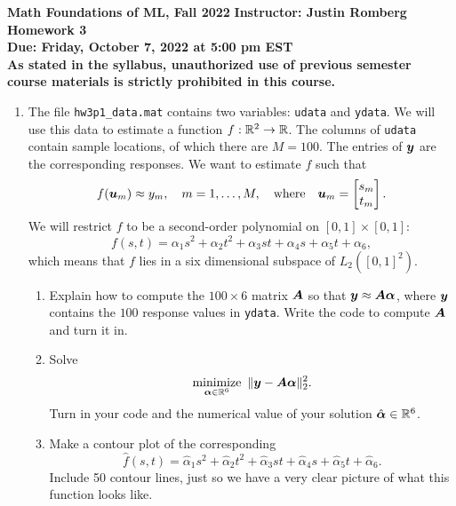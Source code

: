 \documentclass[11pt]{article}
\begin{document}

\noindent
{\bf\large Math Foundations of ML, Fall 2022} \hspace{2cm} {\bf\large Instructor: Justin Romberg} \\[3mm]
{\bf Homework 3} \\[3mm]
{\bf Due: Friday, October 7, 2022 at 5:00 pm EST}\\[3mm]

{\bf As stated in the syllabus, unauthorized use of previous semester course materials is strictly prohibited in this course.}

\begin{enumerate}













\vspace{4mm} 
\item The file \texttt{hw3p1\_data.mat} contains two variables: \texttt{udata} and \texttt{ydata}.  We will use this data to estimate a function $f:\mathbb{R}^2\rightarrow\mathbb{R}$.  The columns of \texttt{udata} contain sample locations, of which there are $M=100$.  The entries of $\boldsymbol{y}$ are the corresponding responses.  We want to estimate $f$ such that
\[
	f(\boldsymbol{u}_m)\approx y_m,\quad m = 1,\ldots,M, \quad\text{where}\quad \boldsymbol{u}_m = \begin{bmatrix} s_m \\ t_m \end{bmatrix}.
\]
We will restrict $f$ to be a second-order polynomial on $[0,1]\times[0,1]$:
\begin{equation}
	\label{eq:secondorderpoly}
	f(s,t) = \alpha_1s^2 + \alpha_2t^2 + \alpha_3st + \alpha_4s + \alpha_5t + \alpha_6,
\end{equation}
which means that $f$ lies in a six dimensional subspace of $L_2([0,1]^2)$.
\begin{enumerate}
	\item Explain how to compute the $100\times 6$ matrix $\boldsymbol{A}$ so that $\boldsymbol{y}\approx\boldsymbol{A}\boldsymbol{\alpha}$, where $\boldsymbol{y}$ contains the $100$ response values in \texttt{ydata}.  Write the code to compute $\boldsymbol{A}$ and turn it in.
	\item Solve 
	\[
		\operatorname*{\text{minimize}}_{\boldsymbol{\alpha}\in\mathbb{R}^6}~\|\boldsymbol{y}-\boldsymbol{A}\boldsymbol{\alpha}\|_2^2.
	\] 
	Turn in your code and the numerical value of your solution $\hat{\boldsymbol{\alpha}}\in\mathbb{R}^6$.
	\item Make a contour plot of the corresponding 
	\[
		\hat{f}(s,t) =  \hat\alpha_1s^2 + \hat\alpha_2t^2 + \hat\alpha_3st + \hat\alpha_4s + \hat\alpha_5t + \hat\alpha_6.
	\]
	Include 50 contour lines, just so we have a very clear picture of what this function looks like.
\end{enumerate}













\end{enumerate}
\end{document}

